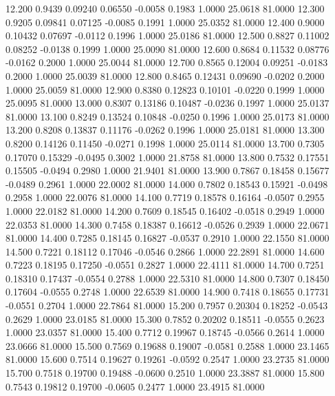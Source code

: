   12.200   0.9439   0.09240   0.06550  -0.0058   0.1983   1.0000  25.0618  81.0000
  12.300   0.9205   0.09841   0.07125  -0.0085   0.1991   1.0000  25.0352  81.0000
  12.400   0.9000   0.10432   0.07697  -0.0112   0.1996   1.0000  25.0186  81.0000
  12.500   0.8827   0.11002   0.08252  -0.0138   0.1999   1.0000  25.0090  81.0000
  12.600   0.8684   0.11532   0.08776  -0.0162   0.2000   1.0000  25.0044  81.0000
  12.700   0.8565   0.12004   0.09251  -0.0183   0.2000   1.0000  25.0039  81.0000
  12.800   0.8465   0.12431   0.09690  -0.0202   0.2000   1.0000  25.0059  81.0000
  12.900   0.8380   0.12823   0.10101  -0.0220   0.1999   1.0000  25.0095  81.0000
  13.000   0.8307   0.13186   0.10487  -0.0236   0.1997   1.0000  25.0137  81.0000
  13.100   0.8249   0.13524   0.10848  -0.0250   0.1996   1.0000  25.0173  81.0000
  13.200   0.8208   0.13837   0.11176  -0.0262   0.1996   1.0000  25.0181  81.0000
  13.300   0.8200   0.14126   0.11450  -0.0271   0.1998   1.0000  25.0114  81.0000
  13.700   0.7305   0.17070   0.15329  -0.0495   0.3002   1.0000  21.8758  81.0000
  13.800   0.7532   0.17551   0.15505  -0.0494   0.2980   1.0000  21.9401  81.0000
  13.900   0.7867   0.18458   0.15677  -0.0489   0.2961   1.0000  22.0002  81.0000
  14.000   0.7802   0.18543   0.15921  -0.0498   0.2958   1.0000  22.0076  81.0000
  14.100   0.7719   0.18578   0.16164  -0.0507   0.2955   1.0000  22.0182  81.0000
  14.200   0.7609   0.18545   0.16402  -0.0518   0.2949   1.0000  22.0353  81.0000
  14.300   0.7458   0.18387   0.16612  -0.0526   0.2939   1.0000  22.0671  81.0000
  14.400   0.7285   0.18145   0.16827  -0.0537   0.2910   1.0000  22.1550  81.0000
  14.500   0.7221   0.18112   0.17046  -0.0546   0.2866   1.0000  22.2891  81.0000
  14.600   0.7223   0.18195   0.17250  -0.0551   0.2827   1.0000  22.4111  81.0000
  14.700   0.7251   0.18310   0.17437  -0.0554   0.2788   1.0000  22.5310  81.0000
  14.800   0.7307   0.18450   0.17604  -0.0555   0.2748   1.0000  22.6539  81.0000
  14.900   0.7418   0.18655   0.17731  -0.0551   0.2704   1.0000  22.7864  81.0000
  15.200   0.7957   0.20304   0.18252  -0.0543   0.2629   1.0000  23.0185  81.0000
  15.300   0.7852   0.20202   0.18511  -0.0555   0.2623   1.0000  23.0357  81.0000
  15.400   0.7712   0.19967   0.18745  -0.0566   0.2614   1.0000  23.0666  81.0000
  15.500   0.7569   0.19688   0.19007  -0.0581   0.2588   1.0000  23.1465  81.0000
  15.600   0.7514   0.19627   0.19261  -0.0592   0.2547   1.0000  23.2735  81.0000
  15.700   0.7518   0.19700   0.19488  -0.0600   0.2510   1.0000  23.3887  81.0000
  15.800   0.7543   0.19812   0.19700  -0.0605   0.2477   1.0000  23.4915  81.0000
